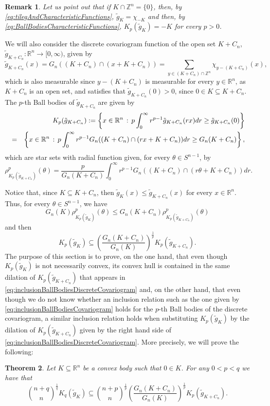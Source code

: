 \documentclass[10pt]{amsart}
\newtheorem{thm}{Theorem}[section]
\newtheorem{rmk}[thm]{Remark}
\def\R{\mathbb{R}}
\def\Z{\mathbb{Z}}
\numberwithin{equation}{section}
\begin{document}
\begin{rmk}\label{rmk:OnePoint}
Let us point out that if $K\cap\Z^n=\{0\}$, then, by \eqref{eq:tilegAndCharacteristicFunctions}, $\tilde{g}_K=\chi_{-K}$ and then, by \eqref{eq:BallBodiesCharacteristicFunctions}, $K_p(\tilde{g}_K)=-K$ for every $p>0$.
\end{rmk}

We will also consider the discrete covariogram function of the open set $K+C_n$, $\tilde{g}_{K+C_n}:\R^n\to[0,\infty)$, given by
$$
\tilde{g}_{K+C_n}(x)=G_n((K+C_n)\cap(x+K+C_n))=\sum_{y\in (K+C_n)\cap\Z^n}\chi_{y-(K+C_n)}(x),
$$
which is also measurable since $y-(K+C_n)$ is measurable for every $y\in\R^n$, as $K+C_n$ is an open set, and satisfies that $\tilde{g}_{K+C_n}(0)>0$, since $0\in K\subseteq K+C_n$. The $p$-th Ball bodies of $\tilde{g}_{K+C_n}$ are given by
\begin{eqnarray*}
&&K_p(\tilde{g}_{K+C_n}):=\left\{x\in\R^n\,:\,p\int_0^\infty r^{p-1}\tilde{g}_{K+C_n}(rx)dr\geq \tilde{g}_{K+C_n}(0)\right\}\cr
&=&\left\{x\in\R^n\,:\,p\int_0^\infty r^{p-1}G_n((K+C_n)\cap(rx+K+C_n))dr\geq G_n(K+C_n)\right\},
\end{eqnarray*}
which are star sets with radial function given, for every $\theta\in S^{n-1}$, by
$$
\rho_{K_p(\tilde{g}_{K+C_n})}^p(\theta)=\frac{p}{G_n(K+C_n)}\int_0^\infty r^{p-1}G_n((K+C_n)\cap(r\theta+K+C_n))dr.
$$

Notice that, since $K\subseteq K+C_n$, then $\tilde{g}_K(x)\leq \tilde{g}_{K+C_n}(x)$ for every $x\in\R^n$. Thus, for every $\theta\in S^{n-1}$, we have
$$
G_n(K)\rho_{K_p(\tilde{g}_K)}^p(\theta)\leq G_n(K+C_n)\rho_{K_p(\tilde{g}_{K+C_n})}^p(\theta)
$$
and then
\begin{equation}\label{eq:inclusionBallBodiesDiscreteCovariogram}
K_p(\tilde{g}_K)\subseteq\left(\frac{G_n(K+C_n)}{G_n(K)}\right)^\frac{1}{p}K_p(\tilde{g}_{K+C_n}).
\end{equation}
The purpose of this section is to prove, on the one hand, that even though $K_p(\tilde{g}_K)$ is not necessarily convex, its convex hull is contained in the same dilation of $K_p(\tilde{g}_{K+C_n})$ that appears in \eqref{eq:inclusionBallBodiesDiscreteCovariogram} and, on the other hand, that even though we do not know whether an inclusion relation such as the one given by \eqref{eq:inclusionBallBodiesCovariogram} holds for the $p$-th Ball bodies of the discrete covariogram, a similar inclusion relation holds when substituting $K_p(\tilde{g}_K)$ by the dilation of $K_p(\tilde{g}_{K+C_n})$ given by the right hand side of \eqref{eq:inclusionBallBodiesDiscreteCovariogram}. More precisely, we will prove the following:
\begin{thm}\label{thm:InclusionBallBodiesDiscreteCovariogram}
Let $K\subseteq\R^n$ be a convex body such that $0\in K$. For any $0<p<q$ we have that
$$
{{n+q}\choose{n}}^\frac{1}{q}K_q(\tilde{g}_{K})\subseteq {{n+p}\choose{n}}^\frac{1}{p}\left(\frac{G_n(K+C_n)}{G_n(K)}\right)^\frac{1}{p}K_p(\tilde{g}_{K+C_n}).
$$
\end{thm}
\end{document}
